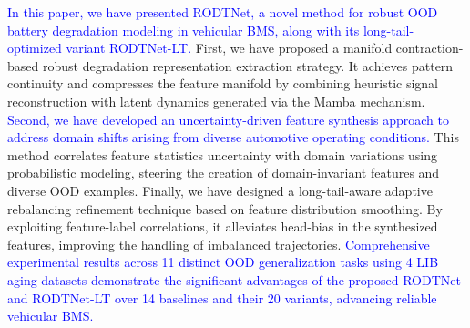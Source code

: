 \documentclass[lettersize,journal]{IEEEtran}
\newcommand{\rev}[1]{\textcolor{blue}{#1}}
\begin{document}
\rev{In this paper, we have presented RODTNet, a novel method for robust OOD battery degradation modeling in vehicular BMS, along with its long-tail-optimized variant RODTNet-LT.}
% 
First, we have proposed a manifold contraction-based robust degradation representation extraction strategy. It achieves pattern continuity and compresses the feature manifold by combining heuristic signal reconstruction with latent dynamics generated via the Mamba mechanism.
% 
\rev{Second, we have developed an uncertainty-driven feature synthesis approach to address domain shifts arising from diverse automotive operating conditions.} This method correlates feature statistics uncertainty with domain variations using probabilistic modeling, steering the creation of domain-invariant features and diverse OOD examples.
% 
Finally, we have designed a long-tail-aware adaptive rebalancing refinement technique based on feature distribution smoothing. By exploiting feature-label correlations, it alleviates head-bias in the synthesized features, improving the handling of imbalanced trajectories.
% 
\rev{Comprehensive experimental results across 11 distinct OOD generalization tasks using 4 LIB aging datasets demonstrate the significant advantages of the proposed RODTNet and RODTNet-LT over 14 baselines and their 20 variants, advancing reliable vehicular BMS.}






 


\end{document}
